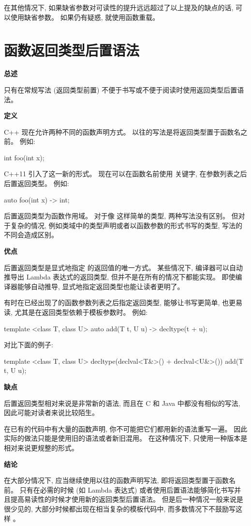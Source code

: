 在其他情况下, 如果缺省参数对可读性的提升远远超过了以上提及的缺点的话, 可以使用缺省参数。 如果仍有疑惑, 就使用函数重载。

\section{函数返回类型后置语法}

\textbf{总述}

只有在常规写法 (返回类型前置) 不便于书写或不便于阅读时使用返回类型后置语法。

\textbf{定义}

C++ 现在允许两种不同的函数声明方式。 以往的写法是将返回类型置于函数名之前。 例如:

\begin{cppcode}
int foo(int x);
\end{cppcode}

C++11 引入了这一新的形式。 现在可以在函数名前使用  关键字, 在参数列表之后后置返回类型。 例如:

\begin{cppcode}
auto foo(int x) -> int;
\end{cppcode}

后置返回类型为函数作用域。 对于像  这样简单的类型, 两种写法没有区别。 但对于复杂的情况, 例如类域中的类型声明或者以函数参数的形式书写的类型, 写法的不同会造成区别。

\textbf{优点}

后置返回类型是显式地指定  的返回值的唯一方式。 某些情况下, 编译器可以自动推导出 Lambda 表达式的返回类型, 但并不是在所有的情况下都能实现。 即使编译器能够自动推导, 显式地指定返回类型也能让读者更明了。

有时在已经出现了的函数参数列表之后指定返回类型, 能够让书写更简单, 也更易读, 尤其是在返回类型依赖于模板参数时。 例如:

\begin{cppcode}
  template <class T, class U> auto add(T t, U u) -> decltype(t + u);
\end{cppcode}

对比下面的例子:

\begin{cppcode}
  template <class T, class U> decltype(declval<T&>() + declval<U&>()) add(T t, U u);
\end{cppcode}

\textbf{缺点}

后置返回类型相对来说是非常新的语法, 而且在 C 和 Java 中都没有相似的写法, 因此可能对读者来说比较陌生。

在已有的代码中有大量的函数声明, 你不可能把它们都用新的语法重写一遍。 因此实际的做法只能是使用旧的语法或者新旧混用。 在这种情况下, 只使用一种版本是相对来说更规整的形式。

\textbf{结论}

在大部分情况下, 应当继续使用以往的函数声明写法, 即将返回类型置于函数名前。 只有在必需的时候 (如 Lambda 表达式) 或者使用后置语法能够简化书写并且提高易读性的时候才使用新的返回类型后置语法。 但是后一种情况一般来说是很少见的, 大部分时候都出现在相当复杂的模板代码中, 而多数情况下不鼓励写这样 。

